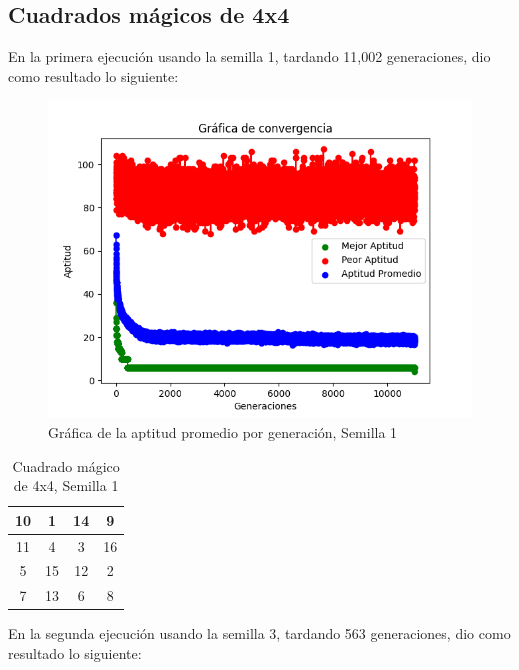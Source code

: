 \documentclass{report}
\begin{document}
    \subsection{Cuadrados mágicos de 4x4}
    En la primera ejecución usando la semilla 1, tardando 11,002 generaciones, dio como resultado lo siguiente:
    \begin{figure}[H]
        \centering
        \includegraphics[scale=0.5]{Grafica1_2.png}
        \caption{Gráfica de la aptitud promedio por generación, Semilla 1}
    \end{figure}
    \begin{table}[H]
        \centering
        \begin{tabular}{|c|c|c|c|}
            \hline
            10 & 1 & 14 & 9\\
            \hline
            11 & 4 & 3 & 16\\
            \hline
            5 & 15 & 12 & 2\\
            \hline
            7 & 13 & 6 & 8\\
            \hline
        \end{tabular}
        \caption{Cuadrado mágico de 4x4, Semilla 1}
    \end{table}
    En la segunda ejecución usando la semilla 3, tardando 563 generaciones, dio como resultado lo siguiente:
\end{document}
